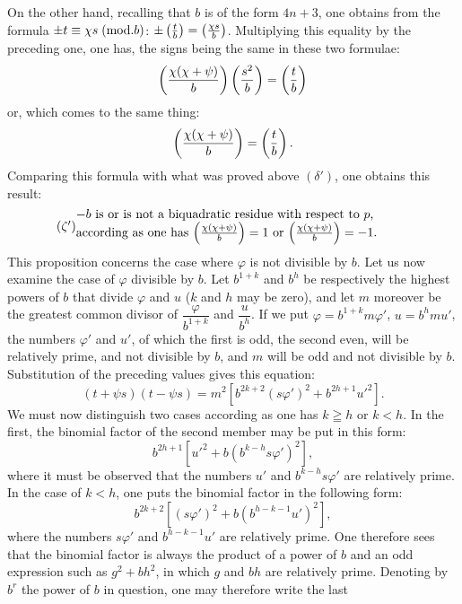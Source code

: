 \noindent
On the other hand, recalling that $b$ is of the form $4n+3$, one obtains
from the formula $\pm t\equiv\chi s\;(\mathrm{mod}.b)$: $\pm\left(\frac{t}{b}\right)=\left(\frac{\chi s}{b}\right)$. Multiplying this equality
by the preceding one, one has, the signs being the same in these two
formulae:
\[
\left(\frac{\chi(\chi+\psi)}{b}\right)\left(\frac{s^2}{b}\right)=\left(\frac{t}{b}\right)
\]
or, which comes to the same thing:
\[
\left(\frac{\chi(\chi+\psi)}{b}\right)=\left(\frac{t}{b}\right).
\]
Comparing this formula with what was proved above $(\delta')$, one obtains
this result:
\begin{equation*}\tag{$\zeta'$}
\begin{minipage}{0.83\textwidth}
$-b$ is or is not a biquadratic residue with respect to $p$,\par
according as one has $\leg{\chi(\chi+\psi)}{b}=1$ or $\leg{\chi(\chi+\psi)}{b}=-1$.
\end{minipage}
\end{equation*}
This proposition concerns the case where $\varphi$ is not divisible by $b$. Let us
now examine the case of $\varphi$ divisible by $b$. Let $b^{1+k}$ and $b^h$ be respectively
the highest powers of $b$ that divide $\varphi$ and $u$ ($k$ and $h$ may be
zero), and let $m$ moreover be the greatest common divisor of $\dfrac{\varphi}{b^{1+k}}$ and $\dfrac{u}{b^h}$. If we
put $\varphi=b^{1+k}m\varphi'$, $u=b^hmu'$, the numbers $\varphi'$ and $u'$, of which the first is
odd, the second even, will be relatively prime, and not divisible by $b$, and $m$
will be odd and not divisible by $b$. Substitution of the preceding values
gives this equation:
\[
(t+\psi s)(t-\psi s)=m^2[b^{2k+2}(s\varphi')^2+b^{2h+1}u'^2].
\]
We must now distinguish two cases according as one has $k\geqq h$ or $k<h$.
In the first, the binomial factor of the second member may be put in this
form:
\[
b^{2h+1}[u'^2+b(b^{k-h}s\varphi')^2],
\]
where it must be observed that the numbers $u'$ and $b^{k-h}s\varphi'$ are relatively prime.
In the case of $k<h$, one puts the binomial factor in the following form:
\[
b^{2k+2}[(s\varphi')^2+b(b^{h-k-1}u')^2],
\]
where the numbers $s\varphi'$ and $b^{h-k-1}u'$ are relatively prime. One therefore sees that the
binomial factor is always the product of a power of $b$ and an odd expression
such as $g^2+bh^2$, in which $g$ and $bh$ are relatively prime. Denoting
by $b^r$ the power of $b$ in question, one may therefore write the last
